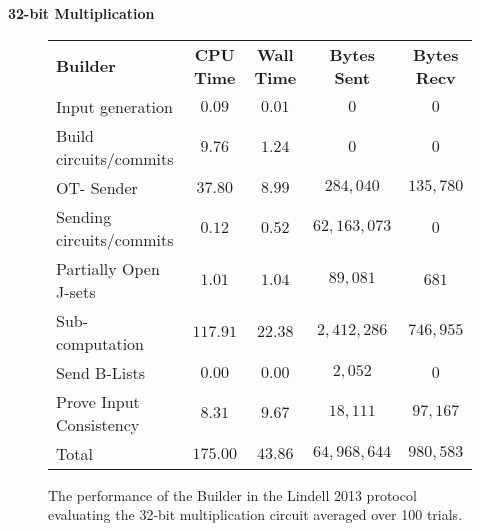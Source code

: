 \documentclass[ %
                    author={Nicholas Tutte},
                supervisor={Prof. Nigel Smart},
                    degree={MEng},
                     title={Secure Two Party Computation},
                  subtitle={A practical comparison of recent protocols},
                      type={Research - GG1K},
                      year={2015} ]{dissertation}
\begin{document}
				\FloatBarrier
				\noindent \textbf{32-bit Multiplication}
				\begin{figure}[!ht]
					\begin{tabular}{| p{4.3cm} | c c c c |}
						\hline
						\textbf{Builder} & \textbf{CPU Time} & \textbf{Wall Time} & \textbf{Bytes Sent} & \textbf{Bytes Recv} \\
						\thickhline
						Input generation & $0.09$ & $0.01$ & $0$ & $0$ \\
						\hline
						Build circuits/commits & $9.76$ & $1.24$ & $0$ & $0$ \\
						\hline
						OT- Sender & $37.80$ & $8.99$ & $284,040$ & $135,780$ \\
						\hline
						Sending circuits/commits & $0.12$ & $0.52$ & $62,163,073$ & $0$ \\
						\hline
						Partially Open J-sets & $1.01$ & $1.04$ & $89,081$ & $681$ \\
						\hline
						Sub-computation & $117.91$ & $22.38$ & $2,412,286$ & $746,955$ \\
						\hline
						Send B-Lists & $0.00$ & $0.00$ & $2,052$ & $0$ \\
						\hline
						Prove Input Consistency & $8.31$ & $9.67$ & $18,111$ & $97,167$ \\
						\thickhline
						Total & $175.00$ & $43.86$ & $64,968,644$ & $980,583$ \\
						\hline
					\end{tabular}
					\caption{The performance of the Builder in the Lindell 2013 protocol evaluating the 32-bit multiplication circuit averaged over 100 trials. \label{table:L_2013_Mul_Builder} }
				\end{figure}
				
\end{document}
